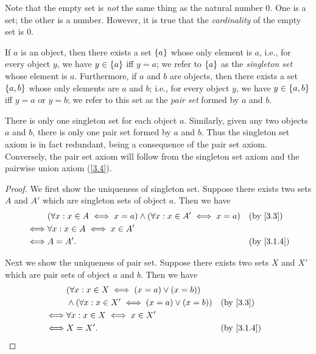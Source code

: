 \begin{rmk}\label{3.1.8}
  Note that the empty set is \emph{not} the same thing as the natural number \(0\).
  One is a set;
  the other is a number.
  However, it is true that the \emph{cardinality} of the empty set is \(0\).
\end{rmk}

\begin{ax}\label{3.3}
  If \(a\) is an object, then there exists a set \(\left\lbrace a\right\rbrace\) whose only element is \(a\), i.e., for every object \(y\), we have \(y \in \left\lbrace a\right\rbrace\) iff \(y = a\);
  we refer to \(\left\lbrace a\right\rbrace\) as the \emph{singleton set} whose element is \(a\).
  Furthermore, if \(a\) and \(b\) are objects, then there exists a set \(\left\lbrace a, b\right\rbrace\) whose only elements are \(a\) and \(b\);
  i.e., for every object \(y\), we have \(y \in \left\lbrace a, b\right\rbrace\) iff \(y = a\) or \(y = b\);
  we refer to this set as the \emph{pair set} formed by \(a\) and \(b\).
\end{ax}

\begin{rmk}\label{3.1.9}
  There is only one singleton set for each object \(a\).
  Similarly, given any two objects \(a\) and \(b\), there is only one pair set formed by \(a\) and \(b\).
  Thus the singleton set axiom is in fact redundant, being a consequence of the pair set axiom.
  Conversely, the pair set axiom will follow from the singleton set axiom and the pairwise union axiom (\cref{3.4}).
\end{rmk}

\begin{proof}
  We first show the uniqueness of singleton set.
  Suppose there exists two sets \(A\) and \(A'\) which are singleton sets of object \(a\).
  Then we have
  \begin{align*}
         & (\forall x : x \in A \iff x = a) \land (\forall x : x \in A' \iff x = a) &  & \by{3.3}   \\
    \iff & \forall x : x \in A \iff x \in A'                                                        \\
    \iff & A = A'.                                                                  &  & \by{3.1.4}
  \end{align*}

  Next we show the uniqueness of pair set.
  Suppose there exists two sets \(X\) and \(X'\) which are pair sets of object \(a\) and \(b\).
  Then we have
  \begin{align*}
         & (\forall x : x \in X \iff (x = a) \lor (x = b))                        \\
         & \land (\forall x : x \in X' \iff (x = a) \lor (x = b)) &  & \by{3.3}   \\
    \iff & \forall x : x \in X \iff x \in X'                                      \\
    \iff & X = X'.                                                &  & \by{3.1.4}
  \end{align*}
\end{proof}

